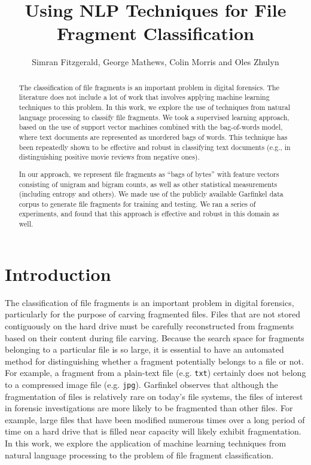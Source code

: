 \documentclass[letter,11pt]{article}
\title{Using NLP Techniques for File Fragment Classification}
\author{Simran Fitzgerald, George Mathews, Colin Morris and Oles Zhulyn}
\begin{document}
\maketitle

\begin{abstract}
The classification of file fragments is an important problem in digital forensics. The literature does not include a lot of work that involves applying machine learning techniques to this problem. In this work, we explore the use of techniques from natural language processing to classify file fragments. We took a supervised learning approach, based on the use of support vector machines combined with the bag-of-words model, where text documents are represented as unordered bags of words. This technique has been repeatedly shown to be effective and robust in classifying text documents (e.g., in distinguishing positive movie reviews from negative ones).

In our approach, we represent file fragments as ``bags of bytes'' with feature vectors consisting of unigram and bigram counts, as well as other statistical measurements (including entropy and others). We made use of the publicly available Garfinkel data corpus to generate file fragments for training and testing. We ran a series of experiments, and found that this approach is effective and robust in this domain as well.
\end{abstract}

\section{Introduction}
\label{Section:Introduction}
The classification of file fragments is an important problem in digital forensics, particularly for the purpose of carving fragmented files. Files that are not stored contiguously on the hard drive must be carefully reconstructed from fragments based on their content during file carving. Because the search space for fragments belonging to a particular file is so large, it is essential to have an automated method for distinguishing whether a fragment potentially belongs to a file or not. For example, a fragment from a plain-text file (e.g. \texttt{txt}) certainly does not belong to a compressed image file (e.g. \texttt{jpg}). Garfinkel \cite{Garfinkel07} observes that although the fragmentation of files is relatively rare on today's file systems, the files of interest in forensic investigations are more likely to be fragmented than other files. For example, large files that have been modified numerous times over a long period of time on a hard drive that is filled near capacity will likely exhibit fragmentation. In this work, we explore the application of machine learning techniques from natural language processing to the problem of file fragment classification.
\end{document}
